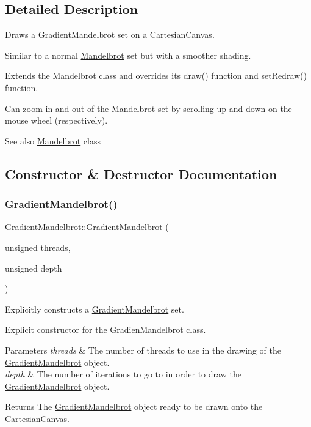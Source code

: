 \subsection{Detailed Description}
Draws a \hyperlink{class_gradient_mandelbrot}{Gradient\+Mandelbrot} set on a Cartesian\+Canvas. 

Similar to a normal \hyperlink{class_mandelbrot}{Mandelbrot} set but with a smoother shading.

Extends the \hyperlink{class_mandelbrot}{Mandelbrot} class and overrides its \hyperlink{class_gradient_mandelbrot_a1d4aa3e44d7d1c2241545b60c79985df}{draw()} function and set\+Redraw() function.

Can zoom in and out of the \hyperlink{class_mandelbrot}{Mandelbrot} set by scrolling up and down on the mouse wheel (respectively). \begin{DoxySeeAlso}{See also}
\hyperlink{class_mandelbrot}{Mandelbrot} class 
\end{DoxySeeAlso}


\subsection{Constructor \& Destructor Documentation}
\mbox{\label{class_gradient_mandelbrot_a4284747d6cef5b030fc82ffea41c850d}} 
\subsubsection{\texorpdfstring{Gradient\+Mandelbrot()}{GradientMandelbrot()}}
{\footnotesize\ttfamily Gradient\+Mandelbrot\+::\+Gradient\+Mandelbrot (\begin{DoxyParamCaption}\item[{unsigned}]{threads,  }\item[{unsigned}]{depth }\end{DoxyParamCaption})}



Explicitly constructs a \hyperlink{class_gradient_mandelbrot}{Gradient\+Mandelbrot} set. 

Explicit constructor for the Gradien\+Mandelbrot class. 
\begin{DoxyParams}{Parameters}
{\em threads} & The number of threads to use in the drawing of the \hyperlink{class_gradient_mandelbrot}{Gradient\+Mandelbrot} object. \\
\hline
{\em depth} & The number of iterations to go to in order to draw the \hyperlink{class_gradient_mandelbrot}{Gradient\+Mandelbrot} object. \\
\hline
\end{DoxyParams}
\begin{DoxyReturn}{Returns}
The \hyperlink{class_gradient_mandelbrot}{Gradient\+Mandelbrot} object ready to be drawn onto the Cartesian\+Canvas. 
\end{DoxyReturn}


